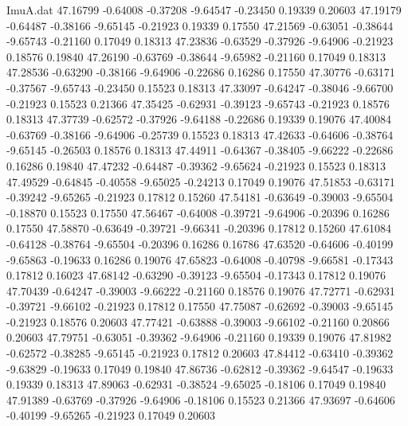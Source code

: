 \begin{filecontents}{ImuA.dat}
  47.16799   -0.64008   -0.37208   -9.64547   -0.23450    0.19339    0.20603
  47.19179   -0.64487   -0.38166   -9.65145   -0.21923    0.19339    0.17550
  47.21569   -0.63051   -0.38644   -9.65743   -0.21160    0.17049    0.18313
  47.23836   -0.63529   -0.37926   -9.64906   -0.21923    0.18576    0.19840
  47.26190   -0.63769   -0.38644   -9.65982   -0.21160    0.17049    0.18313
  47.28536   -0.63290   -0.38166   -9.64906   -0.22686    0.16286    0.17550
  47.30776   -0.63171   -0.37567   -9.65743   -0.23450    0.15523    0.18313
  47.33097   -0.64247   -0.38046   -9.66700   -0.21923    0.15523    0.21366
  47.35425   -0.62931   -0.39123   -9.65743   -0.21923    0.18576    0.18313
  47.37739   -0.62572   -0.37926   -9.64188   -0.22686    0.19339    0.19076
  47.40084   -0.63769   -0.38166   -9.64906   -0.25739    0.15523    0.18313
  47.42633   -0.64606   -0.38764   -9.65145   -0.26503    0.18576    0.18313
  47.44911   -0.64367   -0.38405   -9.66222   -0.22686    0.16286    0.19840
  47.47232   -0.64487   -0.39362   -9.65624   -0.21923    0.15523    0.18313
  47.49529   -0.64845   -0.40558   -9.65025   -0.24213    0.17049    0.19076
  47.51853   -0.63171   -0.39242   -9.65265   -0.21923    0.17812    0.15260
  47.54181   -0.63649   -0.39003   -9.65504   -0.18870    0.15523    0.17550
  47.56467   -0.64008   -0.39721   -9.64906   -0.20396    0.16286    0.17550
  47.58870   -0.63649   -0.39721   -9.66341   -0.20396    0.17812    0.15260
  47.61084   -0.64128   -0.38764   -9.65504   -0.20396    0.16286    0.16786
  47.63520   -0.64606   -0.40199   -9.65863   -0.19633    0.16286    0.19076
  47.65823   -0.64008   -0.40798   -9.66581   -0.17343    0.17812    0.16023
  47.68142   -0.63290   -0.39123   -9.65504   -0.17343    0.17812    0.19076
  47.70439   -0.64247   -0.39003   -9.66222   -0.21160    0.18576    0.19076
  47.72771   -0.62931   -0.39721   -9.66102   -0.21923    0.17812    0.17550
  47.75087   -0.62692   -0.39003   -9.65145   -0.21923    0.18576    0.20603
  47.77421   -0.63888   -0.39003   -9.66102   -0.21160    0.20866    0.20603
  47.79751   -0.63051   -0.39362   -9.64906   -0.21160    0.19339    0.19076
  47.81982   -0.62572   -0.38285   -9.65145   -0.21923    0.17812    0.20603
  47.84412   -0.63410   -0.39362   -9.63829   -0.19633    0.17049    0.19840
  47.86736   -0.62812   -0.39362   -9.64547   -0.19633    0.19339    0.18313
  47.89063   -0.62931   -0.38524   -9.65025   -0.18106    0.17049    0.19840
  47.91389   -0.63769   -0.37926   -9.64906   -0.18106    0.15523    0.21366
  47.93697   -0.64606   -0.40199   -9.65265   -0.21923    0.17049    0.20603

\end{filecontents}
